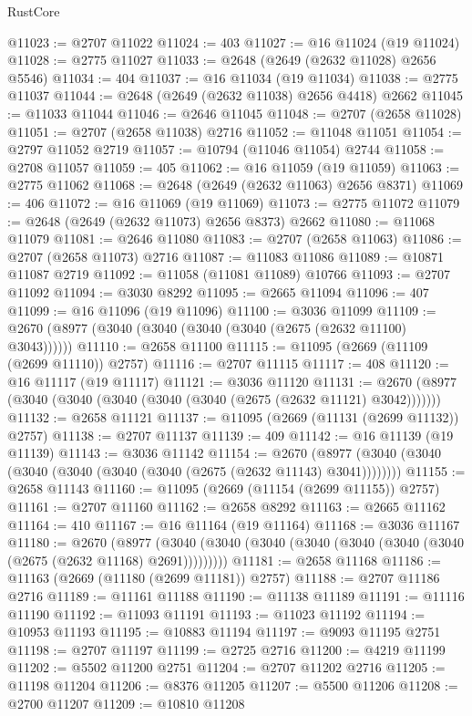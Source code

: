 \begin{lexlean}{RustCore}
\begin{coremodule}
@11023 := @2707 @11022
@11024 := 403
@11027 := @16 @11024 (@19 @11024)
@11028 := @2775 @11027
@11033 := @2648 (@2649 (@2632 @11028) @2656 @5546)
@11034 := 404
@11037 := @16 @11034 (@19 @11034)
@11038 := @2775 @11037
@11044 := @2648 (@2649 (@2632 @11038) @2656 @4418) @2662
@11045 := @11033 @11044
@11046 := @2646 @11045
@11048 := @2707 (@2658 @11028)
@11051 := @2707 (@2658 @11038) @2716
@11052 := @11048 @11051
@11054 := @2797 @11052 @2719
@11057 := @10794 (@11046 @11054) @2744
@11058 := @2708 @11057
@11059 := 405
@11062 := @16 @11059 (@19 @11059)
@11063 := @2775 @11062
@11068 := @2648 (@2649 (@2632 @11063) @2656 @8371)
@11069 := 406
@11072 := @16 @11069 (@19 @11069)
@11073 := @2775 @11072
@11079 := @2648 (@2649 (@2632 @11073) @2656 @8373) @2662
@11080 := @11068 @11079
@11081 := @2646 @11080
@11083 := @2707 (@2658 @11063)
@11086 := @2707 (@2658 @11073) @2716
@11087 := @11083 @11086
@11089 := @10871 @11087 @2719
@11092 := @11058 (@11081 @11089) @10766
@11093 := @2707 @11092
@11094 := @3030 @8292
@11095 := @2665 @11094
@11096 := 407
@11099 := @16 @11096 (@19 @11096)
@11100 := @3036 @11099
@11109 := @2670 (@8977 (@3040 (@3040 (@3040 (@3040 (@2675 (@2632 @11100) @3043))))))
@11110 := @2658 @11100
@11115 := @11095 (@2669 (@11109 (@2699 @11110)) @2757)
@11116 := @2707 @11115
@11117 := 408
@11120 := @16 @11117 (@19 @11117)
@11121 := @3036 @11120
@11131 := @2670 (@8977 (@3040 (@3040 (@3040 (@3040 (@3040 (@2675 (@2632 @11121) @3042)))))))
@11132 := @2658 @11121
@11137 := @11095 (@2669 (@11131 (@2699 @11132)) @2757)
@11138 := @2707 @11137
@11139 := 409
@11142 := @16 @11139 (@19 @11139)
@11143 := @3036 @11142
@11154 := @2670 (@8977 (@3040 (@3040 (@3040 (@3040 (@3040 (@3040 (@2675 (@2632 @11143) @3041))))))))
@11155 := @2658 @11143
@11160 := @11095 (@2669 (@11154 (@2699 @11155)) @2757)
@11161 := @2707 @11160
@11162 := @2658 @8292
@11163 := @2665 @11162
@11164 := 410
@11167 := @16 @11164 (@19 @11164)
@11168 := @3036 @11167
@11180 := @2670
    (@8977 (@3040 (@3040 (@3040 (@3040 (@3040 (@3040 (@3040 (@2675 (@2632 @11168) @2691)))))))))
@11181 := @2658 @11168
@11186 := @11163 (@2669 (@11180 (@2699 @11181)) @2757)
@11188 := @2707 @11186 @2716
@11189 := @11161 @11188
@11190 := @11138 @11189
@11191 := @11116 @11190
@11192 := @11093 @11191
@11193 := @11023 @11192
@11194 := @10953 @11193
@11195 := @10883 @11194
@11197 := @9093 @11195 @2751
@11198 := @2707 @11197
@11199 := @2725 @2716
@11200 := @4219 @11199
@11202 := @5502 @11200 @2751
@11204 := @2707 @11202 @2716
@11205 := @11198 @11204
@11206 := @8376 @11205
@11207 := @5500 @11206
@11208 := @2700 @11207
@11209 := @10810 @11208

\end{coremodule}
\end{lexlean}
